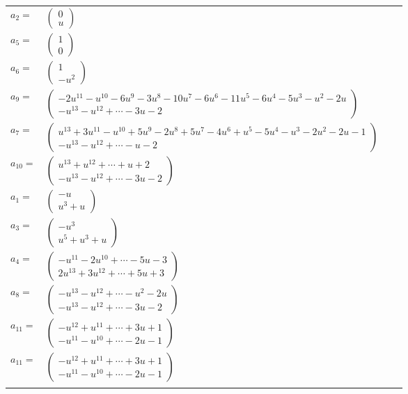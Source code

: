 \documentclass[1p]{elsarticle_modified}
\theoremstyle{definition}
\begin{document}
\begin{tabular}{m{7pt} m{180pt} m{7pt} m{180pt} }
\flushright $a_{2}=$&$\begin{pmatrix}0\\u\end{pmatrix}$ \\
\flushright $a_{5}=$&$\begin{pmatrix}1\\0\end{pmatrix}$ \\
\flushright $a_{6}=$&$\begin{pmatrix}1\\- u^2\end{pmatrix}$ \\
\flushright $a_{9}=$&$\begin{pmatrix}-2 u^{11}- u^{10}-6 u^9-3 u^8-10 u^7-6 u^6-11 u^5-6 u^4-5 u^3- u^2-2 u\\- u^{13}- u^{12}+\cdots-3 u-2\end{pmatrix}$ \\
\flushright $a_{7}=$&$\begin{pmatrix}u^{13}+3 u^{11}- u^{10}+5 u^9-2 u^8+5 u^7-4 u^6+u^5-5 u^4- u^3-2 u^2-2 u-1\\- u^{13}- u^{12}+\cdots- u-2\end{pmatrix}$ \\
\flushright $a_{10}=$&$\begin{pmatrix}u^{13}+u^{12}+\cdots+u+2\\- u^{13}- u^{12}+\cdots-3 u-2\end{pmatrix}$ \\
\flushright $a_{1}=$&$\begin{pmatrix}- u\\u^3+u\end{pmatrix}$ \\
\flushright $a_{3}=$&$\begin{pmatrix}- u^3\\u^5+u^3+u\end{pmatrix}$ \\
\flushright $a_{4}=$&$\begin{pmatrix}- u^{11}-2 u^{10}+\cdots-5 u-3\\2 u^{13}+3 u^{12}+\cdots+5 u+3\end{pmatrix}$ \\
\flushright $a_{8}=$&$\begin{pmatrix}- u^{13}- u^{12}+\cdots- u^2-2 u\\- u^{13}- u^{12}+\cdots-3 u-2\end{pmatrix}$ \\
\flushright $a_{11}=$&$\begin{pmatrix}- u^{12}+u^{11}+\cdots+3 u+1\\- u^{11}- u^{10}+\cdots-2 u-1\end{pmatrix}$\\ \flushright $a_{11}=$&$\begin{pmatrix}- u^{12}+u^{11}+\cdots+3 u+1\\- u^{11}- u^{10}+\cdots-2 u-1\end{pmatrix}$\\&\end{tabular}
\end{document}
